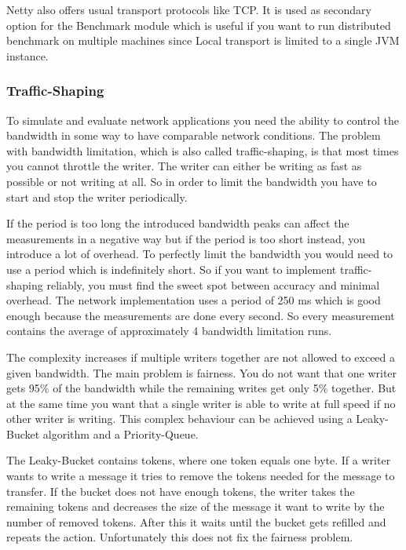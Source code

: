 Netty also offers usual transport protocols like TCP. It is used as secondary option for the Benchmark module which is useful if you want to run distributed benchmark on multiple machines since Local transport is limited to a single JVM instance.


\subsubsection{Traffic-Shaping}
To simulate and evaluate network applications you need the ability to control the bandwidth in some way to have comparable network conditions. The problem with bandwidth limitation, which is also called traffic-shaping, is that most times you cannot throttle the writer. The writer can either be writing as fast as possible or not writing at all. So in order to limit the bandwidth you have to start and stop the writer periodically.

If the period is too long the introduced bandwidth peaks can affect the measurements in a negative way but if the period is too short instead, you introduce a lot of overhead. To perfectly limit the bandwidth you would need to use a period which is indefinitely short. So if you want to implement traffic-shaping reliably, you must find the sweet spot between accuracy and minimal overhead. The network implementation uses a period of 250 ms which is good enough because the measurements are done every second. So every measurement contains the average of approximately 4 bandwidth limitation runs.

The complexity increases if multiple writers together are not allowed to exceed a given bandwidth. The main problem is fairness. You do not want that one writer gets 95\% of the bandwidth while the remaining writes get only 5\% together. But at the same time you want that a single writer is able to write at full speed if no other writer is writing. This complex behaviour can be achieved using a Leaky-Bucket algorithm and a Priority-Queue.

The Leaky-Bucket contains tokens, where one token equals one byte. If a writer wants to write a message it tries to remove the tokens needed for the message to transfer. If the bucket does not have enough tokens, the writer takes the remaining tokens and decreases the size of the message it want to write by the number of removed tokens. After this it waits until the bucket gets refilled and repeats the action. Unfortunately this does not fix the fairness problem.

